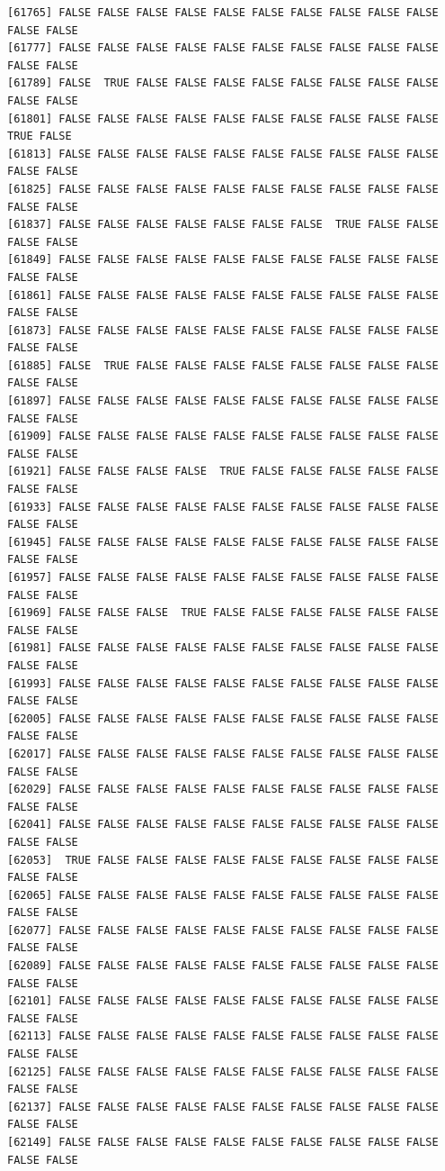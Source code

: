 \documentclass[
  a4paper,
  DIV=11,
  numbers=noendperiod]{scrartcl}
\begin{document}
\begin{verbatim}
[61765] FALSE FALSE FALSE FALSE FALSE FALSE FALSE FALSE FALSE FALSE FALSE FALSE
[61777] FALSE FALSE FALSE FALSE FALSE FALSE FALSE FALSE FALSE FALSE FALSE FALSE
[61789] FALSE  TRUE FALSE FALSE FALSE FALSE FALSE FALSE FALSE FALSE FALSE FALSE
[61801] FALSE FALSE FALSE FALSE FALSE FALSE FALSE FALSE FALSE FALSE  TRUE FALSE
[61813] FALSE FALSE FALSE FALSE FALSE FALSE FALSE FALSE FALSE FALSE FALSE FALSE
[61825] FALSE FALSE FALSE FALSE FALSE FALSE FALSE FALSE FALSE FALSE FALSE FALSE
[61837] FALSE FALSE FALSE FALSE FALSE FALSE FALSE  TRUE FALSE FALSE FALSE FALSE
[61849] FALSE FALSE FALSE FALSE FALSE FALSE FALSE FALSE FALSE FALSE FALSE FALSE
[61861] FALSE FALSE FALSE FALSE FALSE FALSE FALSE FALSE FALSE FALSE FALSE FALSE
[61873] FALSE FALSE FALSE FALSE FALSE FALSE FALSE FALSE FALSE FALSE FALSE FALSE
[61885] FALSE  TRUE FALSE FALSE FALSE FALSE FALSE FALSE FALSE FALSE FALSE FALSE
[61897] FALSE FALSE FALSE FALSE FALSE FALSE FALSE FALSE FALSE FALSE FALSE FALSE
[61909] FALSE FALSE FALSE FALSE FALSE FALSE FALSE FALSE FALSE FALSE FALSE FALSE
[61921] FALSE FALSE FALSE FALSE  TRUE FALSE FALSE FALSE FALSE FALSE FALSE FALSE
[61933] FALSE FALSE FALSE FALSE FALSE FALSE FALSE FALSE FALSE FALSE FALSE FALSE
[61945] FALSE FALSE FALSE FALSE FALSE FALSE FALSE FALSE FALSE FALSE FALSE FALSE
[61957] FALSE FALSE FALSE FALSE FALSE FALSE FALSE FALSE FALSE FALSE FALSE FALSE
[61969] FALSE FALSE FALSE  TRUE FALSE FALSE FALSE FALSE FALSE FALSE FALSE FALSE
[61981] FALSE FALSE FALSE FALSE FALSE FALSE FALSE FALSE FALSE FALSE FALSE FALSE
[61993] FALSE FALSE FALSE FALSE FALSE FALSE FALSE FALSE FALSE FALSE FALSE FALSE
[62005] FALSE FALSE FALSE FALSE FALSE FALSE FALSE FALSE FALSE FALSE FALSE FALSE
[62017] FALSE FALSE FALSE FALSE FALSE FALSE FALSE FALSE FALSE FALSE FALSE FALSE
[62029] FALSE FALSE FALSE FALSE FALSE FALSE FALSE FALSE FALSE FALSE FALSE FALSE
[62041] FALSE FALSE FALSE FALSE FALSE FALSE FALSE FALSE FALSE FALSE FALSE FALSE
[62053]  TRUE FALSE FALSE FALSE FALSE FALSE FALSE FALSE FALSE FALSE FALSE FALSE
[62065] FALSE FALSE FALSE FALSE FALSE FALSE FALSE FALSE FALSE FALSE FALSE FALSE
[62077] FALSE FALSE FALSE FALSE FALSE FALSE FALSE FALSE FALSE FALSE FALSE FALSE
[62089] FALSE FALSE FALSE FALSE FALSE FALSE FALSE FALSE FALSE FALSE FALSE FALSE
[62101] FALSE FALSE FALSE FALSE FALSE FALSE FALSE FALSE FALSE FALSE FALSE FALSE
[62113] FALSE FALSE FALSE FALSE FALSE FALSE FALSE FALSE FALSE FALSE FALSE FALSE
[62125] FALSE FALSE FALSE FALSE FALSE FALSE FALSE FALSE FALSE FALSE FALSE FALSE
[62137] FALSE FALSE FALSE FALSE FALSE FALSE FALSE FALSE FALSE FALSE FALSE FALSE
[62149] FALSE FALSE FALSE FALSE FALSE FALSE FALSE FALSE FALSE FALSE FALSE FALSE

\end{verbatim}
\end{document}

